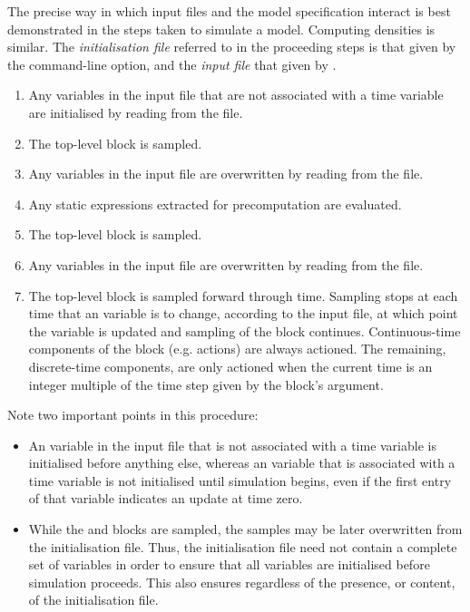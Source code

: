 The precise way in which input files and the model specification interact is
best demonstrated in the steps taken to simulate a model. Computing densities
is similar. The \emph{initialisation file} referred to in the proceeding steps
is that given by the  command-line option, and the
\emph{input file} that given by .
\begin{enumerate}
\item Any  variables in the input file that are not associated with
  a time variable are initialised by reading from the file.
\item The  top-level block is sampled.
\item Any  variables in the input file are overwritten by reading
  from the file.
\item Any static expressions extracted for precomputation are evaluated.
\item The  top-level block is sampled.
\item Any  variables in the input file are overwritten by reading
  from the file.
\item The  top-level block is sampled forward through
  time. Sampling stops at each time that an  variable is to
  change, according to the input file, at which point the 
  variable is updated and sampling of the  block
  continues. Continuous-time components of the
   block (e.g.  actions) are always
  actioned. The remaining, discrete-time components, are
  only actioned when the current time is an integer multiple of the time step
  given by the  block's  argument.
\end{enumerate}

Note two important points in this procedure:
\begin{itemize}
\item An  variable in the input file that is not associated with a
  time variable is initialised before anything else, whereas an 
  variable that is associated with a time variable is not initialised until
  simulation begins, even if the first entry of that variable indicates an
  update at time zero.
\item While the  and  blocks are
  sampled, the samples may be later overwritten from the initialisation
  file. Thus, the initialisation file need not contain a complete set of
  variables in order to ensure that all variables are initialised before
  simulation proceeds. This also ensures
  regardless of the presence, or content, of the initialisation file.
\end{itemize}

